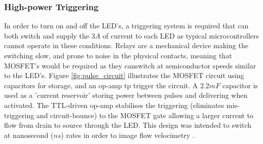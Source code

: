 \documentclass[fleqn,twoside]{article}
\begin{document}
\subsubsection{High-power Triggering}
 

In order to turn on and off the LED's, a triggering system is required that can both switch and supply the $3A$ of current to each LED as typical microcontrollers cannot operate in these conditions. Relays are a mechanical device making the switching slow, and prone to noise in the physical contacts, meaning that MOSFET's would be required as they canswitch at semiconductor speeds similar to the LED's. Figure \ref{fig:pulse_circuit} illustrates the MOSFET circuit using capacitors for storage, and an op-amp tp trigger the circuit. A $2.2mF$ capacitor is used as a 'current reservoir' storing power between pulses and delivering when activated. The TTL-driven op-amp stabilises the triggering (eliminates mis-triggering and circuit-bounce) to the MOSFET gate allowing a larger current to flow from drain to source through the LED. This design was intended to switch at nanosecond ($ns$) rates in order to image flow velocimetry \cite{willert}. 
\end{document}
